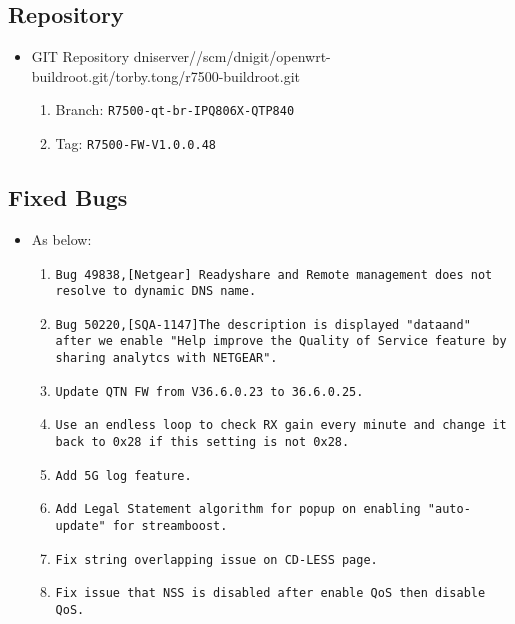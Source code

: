 \documentclass[12pt]{report}
\newcommand{\tlabel}[1]{
  \label{#1}%
  }
\begin{document}
\tlabel{sec:1-0-1}
\subsection{Repository}
\begin{itemize}
	\item GIT Repository dniserver//scm/dnigit/openwrt-buildroot.git/torby.tong/r7500-buildroot.git
	\begin{enumerate}
		\item Branch: \texttt{R7500-qt-br-IPQ806X-QTP840}
                \item Tag: \texttt{R7500-FW-V1.0.0.48}
	\end{enumerate}
\end{itemize}

    \subsection{Fixed Bugs}
    \begin{itemize}
    \item As below:
    	\begin{enumerate}
		\item \texttt{Bug 49838,[Netgear] Readyshare and Remote management does not resolve to dynamic DNS name.}
		\item \texttt{Bug 50220,[SQA-1147]The description is displayed "dataand" after we enable "Help improve the Quality of Service feature by sharing analytcs with NETGEAR".}
		\item \texttt{Update QTN FW from V36.6.0.23 to 36.6.0.25.}
		\item \texttt{Use an endless loop to check RX gain every minute and change it back to 0x28 if this setting is not 0x28.}
		\item \texttt{Add 5G log feature.}
		\item \texttt{Add Legal Statement algorithm for popup on enabling "auto-update" for streamboost.}
		\item \texttt{Fix string overlapping issue on CD-LESS page.}
		\item \texttt{Fix issue that NSS is disabled after enable QoS then disable QoS.}

    	\end{enumerate}
    \end{itemize}
\end{document}
